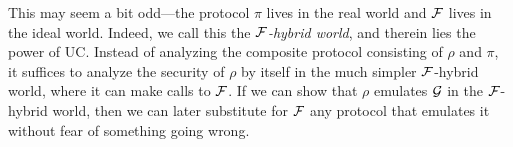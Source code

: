 This may seem a bit odd---the protocol $\pi$ lives in the real world and $\mathcal{{F}}$
lives in the ideal world. Indeed, we call this the \emph{$\mathcal{{F}}$-hybrid world},
and therein lies the power of UC. Instead of analyzing the composite protocol
consisting of $\rho$ and $\pi$, it suffices to analyze the security of $\rho$ by itself
in the much simpler $\mathcal{{F}}$-hybrid world, where it can make calls to
$\mathcal{{F}}$. If we can show that $\rho$ emulates $\mathcal{{G}}$ in the $\mathcal{{F}}$-hybrid
world, then we can later substitute for $\mathcal{{F}}$ any protocol that emulates it
without fear of something going wrong.

